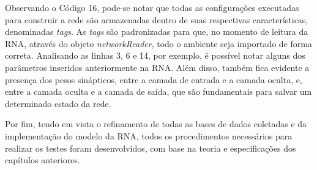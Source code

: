 Observando o Código 16, pode-se notar que todas as configurações executadas para construir a rede são armazenadas dentro de suas respectivas características, denominadas \textit{tags}. As \textit{tags} são padronizadas para que, no momento de leitura da RNA, através do objeto \textit{networkReader}, todo o ambiente seja importado de forma correta. Analisando as linhas 3, 6 e 14, por exemplo, é possível notar alguns dos parâmetros inseridos anteriormente na RNA. Além disso, também fica evidente a presença dos pesos sinápticos, entre a camada de entrada e a camada oculta, e, entre a camada oculta e a camada de saída, que são fundamentais para salvar um determinado estado da rede.

Por fim, tendo em vista o refinamento de todas as bases de dados coletadas e da implementação do modelo da RNA, todos os procedimentos necessários para realizar os testes foram desenvolvidos, com base na teoria e especificações dos capítulos anteriores. 
